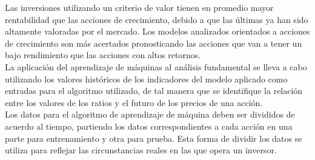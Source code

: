 Las inversiones utilizando un criterio de valor tienen en promedio mayor rentabilidad que las acciones de crecimiento, debido a que las \'ultimas ya han sido altamente valoradas por el mercado. Los modelos analizados orientados a acciones de crecimiento son m\'as acertados pronosticando las acciones que van a tener un bajo rendimiento que las acciones con altos retornos.\\

La aplicaci\'on del aprendizaje de m\'aquinas al an\'alisis fundamental se lleva a cabo utilizando los valores hist\'oricos de los indicadores del modelo aplicado como entradas para el algoritmo utilizado, de tal manera que se identifique la relaci\'on entre los valores de los ratios y el futuro de los precios de una acci\'on.\\

Los datos para el algoritmo de aprendizaje de m\'aquina deben ser divididos de acuerdo al tiempo, partiendo los datos correspondientes a cada acci\'on en una parte para entrenamiento y otra para prueba. Esta forma de dividir los datos se utiliza para reflejar las circunstancias reales en las que opera un inversor.\\



	